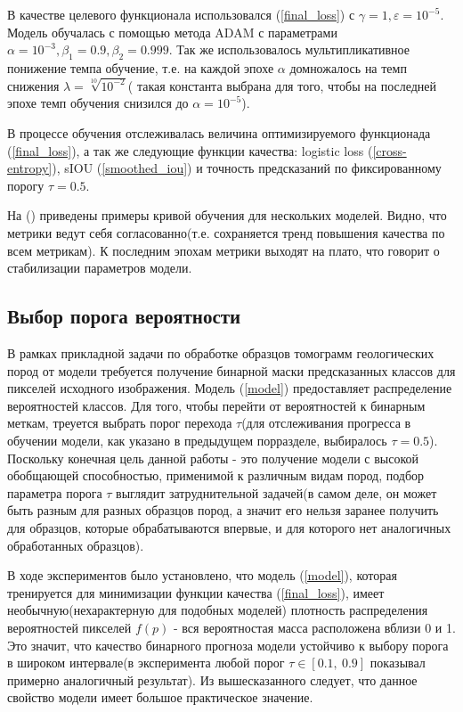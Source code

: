 \documentclass[14pt, a4paper, oneside, bold]{extarticle}
\begin{document}
В качестве целевого функционала использовался (\ref{final_loss}) с 
$\gamma=1, \varepsilon=10^{-5}$. Модель обучалась с помощью метода 
ADAM с параметрами \\
$\alpha=10^{-3}, \beta_1=0.9, \beta_2=0.999$. Так же использовалось 
мультипликативное понижение темпа обучение, т.е. на каждой эпохе 
$\alpha$ домножалось на темп снижения $\lambda=\sqrt[10]{10^{-2}}$( такая константа выбрана для того, чтобы на последней эпохе темп обучения снизился до $\alpha=10^{-5}$).

В процессе обучения отслеживалась величина оптимизируемого функционада (\ref{final_loss}), а так же следующие функции качества:
logistic loss (\ref{cross-entropy}), sIOU (\ref{smoothed_iou}) и 
точность предсказаний по фиксированному порогу $\tau=0.5$. 

На () приведены примеры кривой обучения для нескольких моделей. Видно, что метрики ведут себя согласованно(т.е. сохраняется тренд повышения качества по всем метрикам). К последним эпохам метрики выходят на плато, что говорит о стабилизации параметров модели.


\subsection{Выбор порога вероятности} 

В рамках прикладной задачи по обработке образцов томограмм геологических пород от модели требуется получение бинарной маски предсказанных классов для пикселей исходного изображения. Модель 
(\ref{model}) предоставляет распределение вероятностей классов. Для того, чтобы перейти от вероятностей к бинарным меткам, треуется выбрать порог перехода $\tau$(для отслеживания прогресса в обучении модели, как указано в предыдущем порразделе, выбиралось $\tau=0.5$).
Поскольку конечная цель данной работы - это получение модели с высокой обобщающей способностью, применимой к различным видам пород, подбор параметра порога $\tau$ выглядит затруднительной задачей(в самом деле, он может быть разным для разных образцов пород, а значит его нельзя заранее получить для образцов, которые обрабатываются впервые, и для которого нет аналогичных обработанных образцов).

В ходе экспериментов было установлено, что 
модель (\ref{model}), которая тренируется для минимизации функции качества (\ref{final_loss}), имеет необычную(нехарактерную для подобных моделей) плотность распределения вероятностей пикселей $f(p)$ - вся вероятностая масса расположена вблизи 0 и 1. Это значит, что качество бинарного прогноза модели устойчиво к выбору порога в широком интервале(в эксперимента любой порог $\tau \in [0.1,\ 0.9]$ показывал примерно аналогичный результат). Из вышесказанного следует, что данное свойство модели имеет большое практическое значение. 
\end{document}
